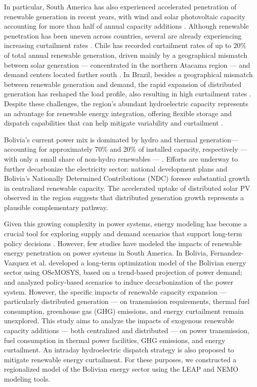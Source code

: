 \documentclass[a4paper,fleqn]{cas-dc}
\begin{document}
In particular, South America has also experienced accelerated penetration of renewable generation in recent years, with wind and solar photovoltaic capacity accounting for more than half of annual capacity additions \cite{IEA2023LatinAmerica}. Although renewable penetration has been uneven across countries, several are already experiencing increasing curtailment rates \cite{vonpapp2022vertimiento, silva2025wind}. Chile has recorded curtailment rates of up to 20\% of total annual renewable generation, driven mainly by a geographical mismatch between solar generation — concentrated in the northern Atacama region — and demand centers located farther south \cite{vonpapp2022vertimiento, silva2025wind}. In Brazil, besides a geographical mismatch between renewable generation and demand, the rapid expansion of distributed generation has reshaped the load profile, also resulting in high curtailment rates \cite{da2025regulatory, silva2026curtailment}. Despite these challenges, the region's abundant hydroelectric capacity \cite{farfan2017structural, IEA2023LatinAmerica} represents an advantage for renewable energy integration, offering flexible storage and dispatch capabilities that can help mitigate variability and curtailment \cite{wan1993factors, hingray2014integrating}.

Bolivia's current power mix is dominated by hydro and thermal generation—accounting for approximately 70\% and 20\% of installed capacity, respectively — with only a small share of non-hydro renewables — \cite{AETN2026}. Efforts are underway to further decarbonize the electricity sector: national development plans \cite{Bolivia_PER2035} and Bolivia's Nationally Determined Contributions (NDC) \cite{Bolivia_NDC2021} foresee substantial growth in centralized renewable capacity. The accelerated uptake of distributed solar PV observed in the region \cite{chueca2023early} suggests that distributed generation growth represents a plausible complementary pathway.

Given this growing complexity in power systems, energy modeling has become a crucial tool for exploring supply and demand scenarios that support long-term policy decisions \cite{huntington1982modeling, pfenninger2014energy}. However, few studies have modeled the impacts of renewable energy penetration on power systems in South America. In Bolivia, Fernandez-Vazquez et al. \cite{fernandez2022energy} developed a long-term optimization model of the Bolivian energy sector using OSeMOSYS, based on a trend-based projection of power demand; and analyzed policy-based scenarios to induce decarbonization of the power system. However, the specific impacts of renewable capacity expansion — particularly distributed generation — on transmission requirements, thermal fuel consumption, greenhouse gas (GHG) emissions, and energy curtailment remain unexplored. This study aims to analyze the impacts of exogenous renewable capacity additions — both centralized and distributed — on power transmission, fuel consumption in thermal power facilities, GHG emissions, and energy curtailment. An intraday hydroelectric dispatch strategy is also proposed to mitigate renewable energy curtailment. For these purposes, we constructed a regionalized model of the Bolivian energy sector using the LEAP and NEMO modeling tools.
\end{document}

